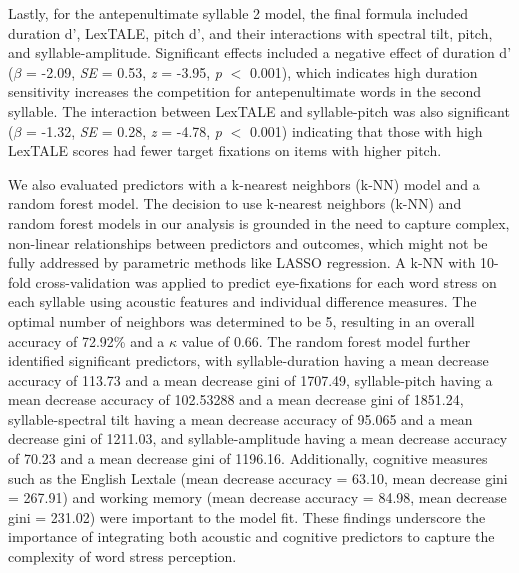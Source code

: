 Lastly, for the antepenultimate syllable 2 model, the final formula included duration d', LexTALE, pitch d', and their interactions with spectral tilt, pitch, and syllable-amplitude. Significant effects included a negative effect of duration d' ($\beta$ = -2.09, \textit{SE} = 0.53, \textit{z} = -3.95, \textit{p} $<$ 0.001), which indicates high duration sensitivity increases the competition for antepenultimate words in the second syllable. The interaction between LexTALE and syllable-pitch was also significant ($\beta$ = -1.32, \textit{SE} = 0.28, \textit{z} = -4.78, \textit{p} $<$ 0.001) indicating that those with high LexTALE scores had fewer target fixations on items with higher pitch.

We also evaluated predictors with a k-nearest neighbors (k-NN) model and a random forest model. The decision to use k-nearest neighbors (k-NN) and random forest models in our analysis is grounded in the need to capture complex, non-linear relationships between predictors and outcomes, which might not be fully addressed by parametric methods like LASSO regression. A k-NN with 10-fold cross-validation was applied to predict eye-fixations for each word stress on each syllable using acoustic features and individual difference measures. The optimal number of neighbors was determined to be 5, resulting in an overall accuracy of 72.92\% and a $\kappa$ value of 0.66. The random forest model further identified significant predictors, with syllable-duration having a mean decrease accuracy of 113.73 and a mean decrease gini of 1707.49, syllable-pitch having a mean decrease accuracy of 102.53288 and a mean decrease gini of 1851.24, syllable-spectral tilt having a mean decrease accuracy of 95.065 and a mean decrease gini of 1211.03, and syllable-amplitude having a mean decrease accuracy of 70.23 and a mean decrease gini of 1196.16. Additionally, cognitive measures such as the English Lextale (mean decrease accuracy = 63.10, mean decrease gini = 267.91) and working memory (mean decrease accuracy = 84.98, mean decrease gini = 231.02) were important to the model fit. These findings underscore the importance of integrating both acoustic and cognitive predictors to capture the complexity of word stress perception.

